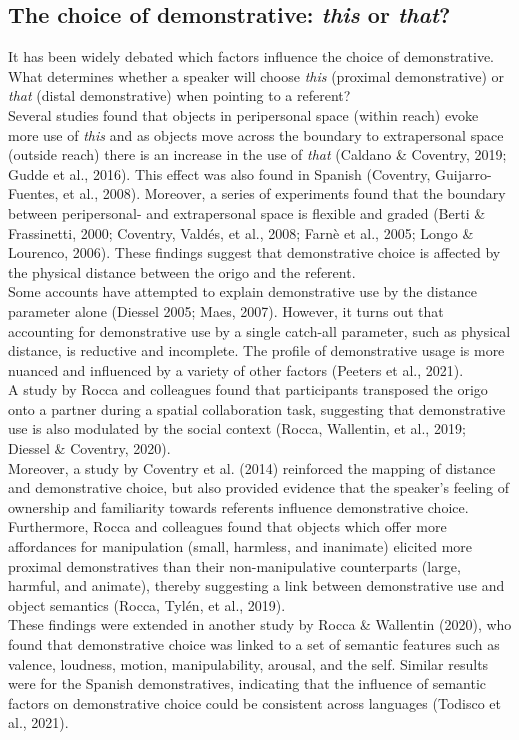\documentclass[11pt, a4paper]{article}
\begin{document}
\subsection{The choice of demonstrative: \textit{this} or \textit{that}?}
It has been widely debated which factors influence the choice of demonstrative. What determines whether a speaker will choose \textit{this} (proximal demonstrative) or \textit{that} (distal demonstrative) when pointing to a referent? \\
Several studies found that objects in peripersonal space (within reach) evoke more use of \textit{this} and as objects move across the boundary to extrapersonal space (outside reach) there is an increase in the use of \textit{that} (Caldano \& Coventry, 2019; Gudde et al., 2016). This effect was also found in Spanish (Coventry, Guijarro-Fuentes, et al., 2008). Moreover, a series of experiments found that the boundary between peripersonal- and extrapersonal space is flexible and graded (Berti \& Frassinetti, 2000; Coventry, Valdés, et al., 2008; Farnè et al., 2005; Longo \& Lourenco, 2006). These findings suggest that demonstrative choice is affected by the physical distance between the origo and the referent. \\ 
Some accounts have attempted to explain demonstrative use by the distance parameter alone (Diessel 2005; Maes, 2007). However, it turns out that accounting for demonstrative use by a single catch-all parameter, such as physical distance, is reductive and incomplete. The profile of demonstrative usage is more nuanced and influenced by a variety of other factors (Peeters et al., 2021). \\

A study by Rocca and colleagues found that participants transposed the origo onto a partner during a spatial collaboration task, suggesting that demonstrative use is also modulated by the social context (Rocca, Wallentin, et al., 2019; Diessel \& Coventry, 2020).\\
Moreover, a study by Coventry et al. (2014) reinforced the mapping of distance and demonstrative choice, but also provided evidence that the speaker’s feeling of ownership and familiarity towards referents influence demonstrative choice. \\
Furthermore, Rocca and colleagues found that objects which offer more affordances for manipulation (small, harmless, and inanimate) elicited more proximal demonstratives than their non-manipulative counterparts (large, harmful, and animate), thereby suggesting a link between demonstrative use and object semantics (Rocca, Tylén, et al., 2019). \\
These findings were extended in another study by Rocca \& Wallentin (2020), who found that demonstrative choice was linked to a set of semantic features such as valence, loudness, motion, manipulability, arousal, and the self. Similar results were for the Spanish demonstratives, indicating that the influence of semantic factors on demonstrative choice could be consistent across languages (Todisco et al., 2021). \\
\end{document}

